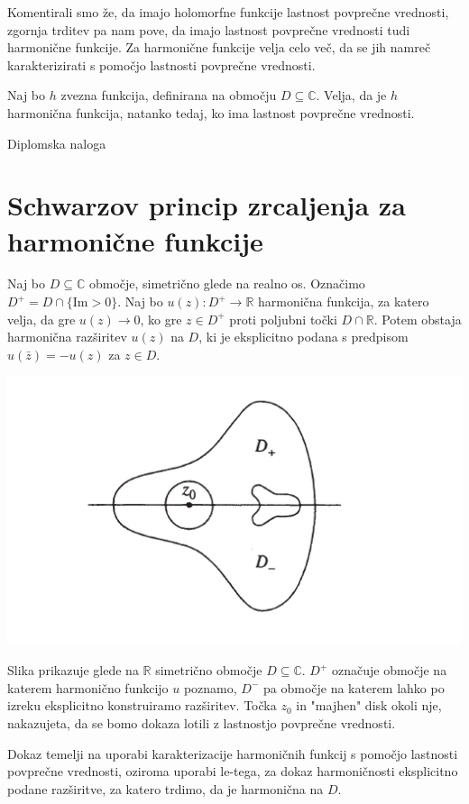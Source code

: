 \documentclass[mat1]{fmfdelo}
\newcommand{\R}{\mathbb R}
\newcommand{\C}{\mathbb C}
\begin{document}
    \begin{opomba}
        Komentirali smo že, da imajo holomorfne funkcije lastnost povprečne vrednosti, zgornja trditev pa nam pove, da imajo lastnost povprečne vrednosti tudi harmonične funkcije. 
        Za harmonične funkcije velja celo več, da se jih namreč karakterizirati s pomočjo lastnosti povprečne vrednosti. 
    \end{opomba}
    \begin{trditev}
        Naj bo $h$ zvezna funkcija, definirana na območju $D \subseteq \C$. Velja, da je $h$ harmonična funkcija, natanko tedaj, ko ima lastnost povprečne vrednosti.
    \end{trditev}
    \begin{dokaz}
        Diplomska naloga
    \end{dokaz}

\newpage
\section{Schwarzov princip zrcaljenja za harmonične funkcije}
    \begin{izrek}
        Naj bo $D \subseteq \C$ območje, simetrično glede na realno os. 
        Označimo $D^{+} = D \cap \{\text{Im} > 0\}$. 
        Naj bo $u(z): D^{+} \to \mathbb{R}$ harmonična funkcija, za katero velja, da gre $u(z) \to 0$, ko gre $z \in D^{+}$ proti poljubni točki $D \cap \mathbb{R}$. 
        Potem obstaja harmonična razširitev $u(z)$ na $D$, ki je eksplicitno podana s predpisom $u(\bar{z}) = - u(z)$ za $z \in D$.
    \end{izrek}
    \begin{center}
        \includegraphics[width = 0.8 \textwidth]{schwarzov_princip_zrcaljenja.png}
    \end{center}
    Slika prikazuje glede na $\R$ simetrično območje $D \subseteq \C$. $D^{+}$ označuje  območje na katerem harmonično funkcijo $u$ poznamo, $D^{-}$ pa območje na katerem lahko po izreku eksplicitno konstruiramo razširitev.
    Točka $z_0$ in "majhen" disk okoli nje, nakazujeta, da se bomo dokaza lotili z lastnostjo povprečne vrednosti.
    \begin{dokaz}
        Dokaz temelji na uporabi karakterizacije harmoničnih funkcij s pomočjo lastnosti povprečne vrednosti, oziroma uporabi le-tega, za dokaz harmoničnosti eksplicitno podane razširitve, za katero trdimo, da je harmonična na $D$.
    \end{dokaz}
\end{document}
